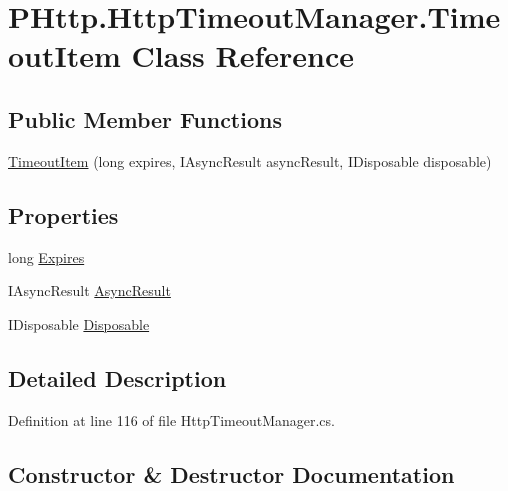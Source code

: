 \hypertarget{class_p_http_1_1_http_timeout_manager_1_1_timeout_item}{}\section{P\+Http.\+Http\+Timeout\+Manager.\+Timeout\+Item Class Reference}
\label{class_p_http_1_1_http_timeout_manager_1_1_timeout_item}
\subsection*{Public Member Functions}
\begin{DoxyCompactItemize}
\item 
\hyperlink{class_p_http_1_1_http_timeout_manager_1_1_timeout_item_a493aede27140fed6cd1e4d93e2d63389}{Timeout\+Item} (long expires, I\+Async\+Result async\+Result, I\+Disposable disposable)
\end{DoxyCompactItemize}
\subsection*{Properties}
\begin{DoxyCompactItemize}
\item 
long \hyperlink{class_p_http_1_1_http_timeout_manager_1_1_timeout_item_a2a2eeec9755d9593fcd9749072d02c8b}{Expires}
\item 
I\+Async\+Result \hyperlink{class_p_http_1_1_http_timeout_manager_1_1_timeout_item_a05fbdc8af660d5aeb530b6471d5bfd1e}{Async\+Result}
\item 
I\+Disposable \hyperlink{class_p_http_1_1_http_timeout_manager_1_1_timeout_item_aa517f8a4b2fb249b30fca2cf01cd99f1}{Disposable}
\end{DoxyCompactItemize}


\subsection{Detailed Description}


Definition at line 116 of file Http\+Timeout\+Manager.\+cs.



\subsection{Constructor \& Destructor Documentation}
\mbox{\label{class_p_http_1_1_http_timeout_manager_1_1_timeout_item_a493aede27140fed6cd1e4d93e2d63389}} 
